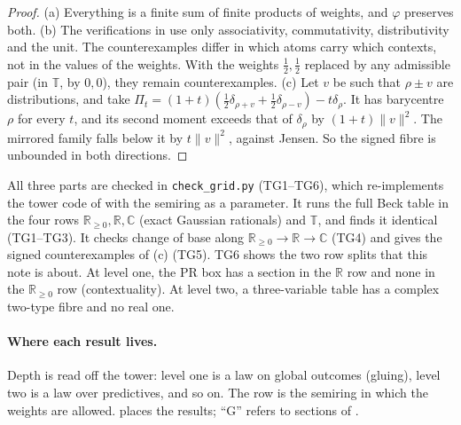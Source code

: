 \documentclass[11pt]{article}
\theoremstyle{definition}\newtheorem{definition}[theorem]{Definition}\newtheorem{remark}[theorem]{Remark}\newtheorem{example}[theorem]{Example}
\newcommand{\R}{\mathbb R}
\providecommand{\T}{\mathbb T}
\begin{document}
\begin{proof}
(a) Everything is a finite sum of finite products of weights, and $\varphi$ preserves both. (b) The verifications in \cite{Tower} use only
associativity, commutativity, distributivity and the unit. The counterexamples differ in which atoms carry which contexts, not in the
values of the weights. With the weights $\tfrac12,\tfrac12$ replaced by any admissible pair (in $\T$, by $0,0$), they remain
counterexamples. (c) Let $v$ be such that $\rho\pm v$ are distributions, and take
$\Pi_t=(1+t)(\tfrac12\delta_{\rho+v}+\tfrac12\delta_{\rho-v})-t\delta_\rho$. It has barycentre $\rho$ for every $t$, and its second
moment exceeds that of $\delta_\rho$ by $(1+t)\|v\|^2$. The mirrored family falls below it by $t\|v\|^2$, against Jensen. So the signed
fibre is unbounded in both directions.
\end{proof}

All three parts are checked in \texttt{check\_grid.py} (TG1--TG6), which re-implements the tower code of \cite{Tower} with the semiring
as a parameter. It runs the full Beck table in the four rows $\R_{\ge0},\R,\mathbb C$ (exact Gaussian rationals) and $\T$, and finds it
identical (TG1--TG3). It checks change of base along $\R_{\ge0}\to\R\to\mathbb C$ (TG4) and gives the signed counterexamples of (c) (TG5).
TG6 shows the two row splits that this note is about. At level one, the PR box has a section in the $\R$ row and none in the $\R_{\ge0}$ row
(contextuality). At level two, a three-variable table has a complex two-type fibre and no real one.

\paragraph{Where each result lives.}
Depth is read off the tower: level one is a law on global outcomes (gluing), level two is a law over predictives, and so on. The row is the
semiring in which the weights are allowed.  places the results; ``G'' refers to sections of \cite{TowerGeometry}.
\end{document}
